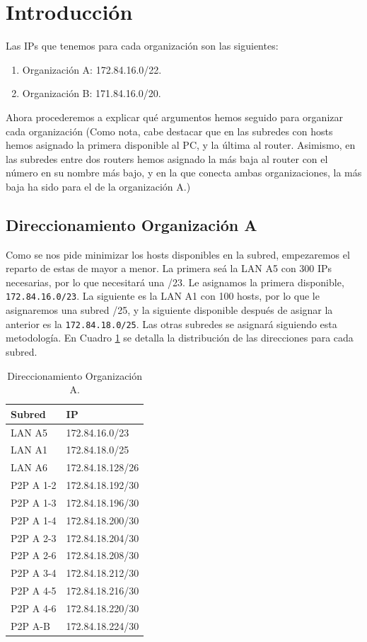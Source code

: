 \documentclass[twoside, 11pt]{article}
\begin{document}
\section{Introducción}

Las IPs que tenemos para cada organización son las siguientes:

\begin{enumerate}
    \item Organización A: 172.84.16.0/22.
    \item Organización B: 171.84.16.0/20.
\end{enumerate}

Ahora procederemos a explicar qué argumentos hemos seguido para organizar cada organización (Como nota, cabe destacar que en las subredes con hosts hemos asignado la primera disponible al PC, y la última al router. Asimismo, en las subredes entre dos routers hemos asignado la más baja al router con el número en su nombre más bajo, y en la que conecta ambas organizaciones, la más baja ha sido para el de la organización A.)

\subsection{Direccionamiento Organización A}
Como se nos pide minimizar los hosts disponibles en la subred, empezaremos el reparto de estas de mayor a menor. La primera seá la LAN A5 con 300 IPs necesarias, por lo que necesitará una /23. Le asignamos la primera disponible, \texttt{172.84.16.0/23}. La siguiente es la LAN A1 con 100 hosts, por lo que le asignaremos una subred /25, y la siguiente disponible después de asignar la anterior es la \texttt{172.84.18.0/25}. Las otras subredes se asignará siguiendo esta metodología. En Cuadro \ref{cuad:1.1} se detalla la distribución de las direcciones para cada subred.

\begin{table}[h]
\centering
\begin{tabular}{l|l}
\toprule
\textbf{Subred} & \textbf{IP} \\
\midrule
LAN A5 & 172.84.16.0/23 \\
LAN A1 & 172.84.18.0/25 \\
LAN A6 & 172.84.18.128/26 \\
P2P A 1-2 & 172.84.18.192/30 \\
P2P A 1-3 & 172.84.18.196/30 \\
P2P A 1-4 & 172.84.18.200/30 \\
P2P A 2-3 & 172.84.18.204/30 \\
P2P A 2-6 & 172.84.18.208/30 \\
P2P A 3-4 & 172.84.18.212/30 \\
P2P A 4-5 & 172.84.18.216/30 \\
P2P A 4-6 & 172.84.18.220/30 \\
P2P A-B & 172.84.18.224/30 \\
\bottomrule
\end{tabular}
\caption{Direccionamiento Organización A.}
\label{cuad:1.1}
\end{table}
\end{document}
